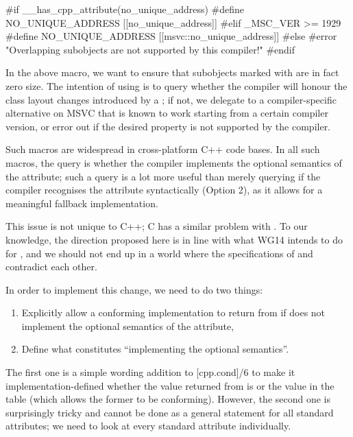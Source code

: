 \begin{codeblock}
#if __has_cpp_attribute(no_unique_address)
  #define NO_UNIQUE_ADDRESS [[no_unique_address]]
#elif _MSC_VER >= 1929
  #define NO_UNIQUE_ADDRESS [[msvc::no_unique_address]]
#else
  #error "Overlapping subobjects are not supported by this compiler!"
#endif
\end{codeblock}

In the above macro, we want to ensure that subobjects marked with  are in fact zero size. The intention of using   is to query whether the compiler will honour the class layout changes introduced by a ; if not, we delegate to a compiler-specific alternative on MSVC that is known to work starting from a certain compiler version, or error out if the desired property is not supported by the compiler.

Such macros are widespread in cross-platform C++ code bases. In all such macros, the query is whether the compiler implements the optional semantics of the attribute; such a query is a lot more useful than merely querying if the compiler recognises the attribute syntactically (Option 2), as it allows for a meaningful fallback implementation.

This issue is not unique to C++; C has a similar problem with . To our knowledge, the direction proposed here is in line with what WG14 intends to do for , and we should not end up in a world where the specifications of  and  contradict each other.

In order to implement this change, we need to do two things:

\begin{enumerate} 
\item Explicitly allow a conforming implementation to return  from  if does not implement the optional semantics of the attribute, 
\item Define what constitutes ``implementing the optional semantics''.
\end{enumerate}

The first one is a simple wording addition to [cpp.cond]/6 to make it implementation-defined whether the value returned from  is  or the value in the table (which allows the former to be conforming). However, the second one is surprisingly tricky and cannot be done as a general statement for all standard attributes; we need to look at every standard attribute individually.

